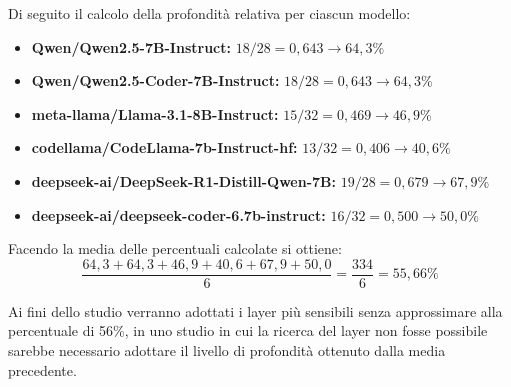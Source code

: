 Di seguito il calcolo della profondità relativa per ciascun modello:
\begin{itemize}[noitemsep]
    \item \textbf{Qwen/Qwen2.5-7B-Instruct:} $18/28 = 0{,}643 \rightarrow 64{,}3\%$
    \item \textbf{Qwen/Qwen2.5-Coder-7B-Instruct:} $18/28 = 0{,}643 \rightarrow 64{,}3\%$
    \item \textbf{meta-llama/Llama-3.1-8B-Instruct:} $15/32 = 0{,}469 \rightarrow 46{,}9\%$
    \item \textbf{codellama/CodeLlama-7b-Instruct-hf:} $13/32 = 0{,}406 \rightarrow 40{,}6\%$
    \item \textbf{deepseek-ai/DeepSeek-R1-Distill-Qwen-7B:} $19/28 = 0{,}679 \rightarrow 67{,}9\%$
    \item \textbf{deepseek-ai/deepseek-coder-6.7b-instruct:} $16/32 = 0{,}500 \rightarrow 50{,}0\%$
\end{itemize}

Facendo la media delle percentuali calcolate si ottiene:
$$ \frac{64{,}3+64{,}3+46{,}9+40{,}6+67{,}9+50{,}0}{6} = \frac{334}{6} = 55{,}66\% $$

Ai fini dello studio verranno adottati i layer più sensibili senza approssimare alla percentuale di 56\%, in uno studio in cui la ricerca del layer non fosse possibile sarebbe necessario adottare il livello di profondità ottenuto dalla media precedente.